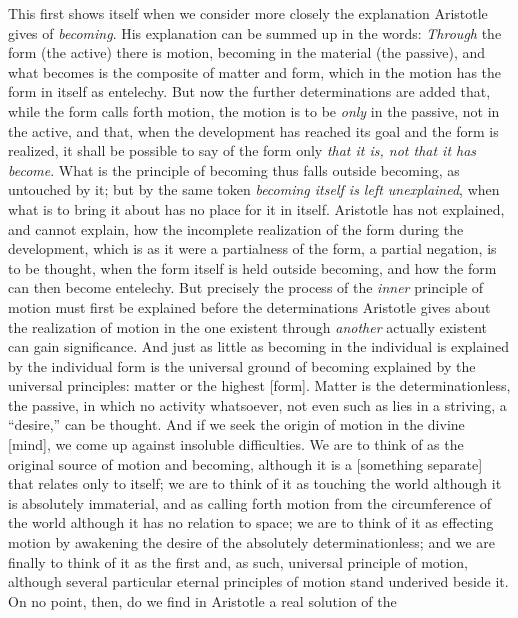 This first shows itself when we consider more closely the explanation
Aristotle gives of \emph{becoming}. His explanation can be summed up in
the words: \emph{Through} the form (the active) there is motion, becoming
in the material (the passive), and what becomes is the
composite of matter and form, which in the motion has the form in itself
as entelechy. But now the further determinations are added that, while
the form calls forth motion, the motion is to be \emph{only} in the
passive, not in the active, and that, when the development has reached
its goal and the form is realized, it shall be possible to say of the
form only \emph{that it is, not that it has become}. What is the
principle of becoming thus falls outside becoming, as untouched by it;
but by the same token \emph{becoming itself is left unexplained}, when
what is to bring it about has no place for it in itself. Aristotle has
not explained, and cannot explain, how the incomplete realization of the
form during the development, which is as it were a partialness of the
form, a partial negation, is to be thought, when the form itself is held
outside becoming, and how the form can then become entelechy. But
precisely the process of the \emph{inner} principle of motion must first
be explained before the determinations Aristotle gives about the
realization of motion in the one existent through \emph{another}
actually existent can gain significance. And just as little as becoming
in the individual is explained by the individual form is the universal
ground of becoming explained by the universal principles: matter or the
highest  [form]. Matter is the determinationless, the passive,
in which no activity whatsoever, not even such as lies in a striving, a
``desire,'' can be thought. And if we seek the origin of motion in the
divine  [mind], we come up against insoluble difficulties. We
are to think of  as the original source of motion and becoming,
although it is a  [something separate] that relates only to
itself; we are to think of it as touching the world although it is
absolutely immaterial, and as calling forth motion from the circumference
of the world although it has no relation to space;
we are to think of it as effecting motion by awakening the desire of the
absolutely determinationless; and we are finally to think of it as the
first and, as such, universal principle of motion, although several
particular eternal principles of motion stand underived beside it. On no
point, then, do we find in Aristotle a real solution of the

